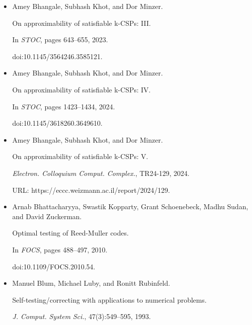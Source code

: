 \begin{itemize}
doi:10.1145/3564246.3585120.





\item[] 
[11]

Amey Bhangale, Subhash Khot, and Dor Minzer.


On approximability of satisfiable k-CSPs: III.


In \emph{STOC}, pages 643–655, 2023.


doi:10.1145/3564246.3585121.





\item[] 
[12]

Amey Bhangale, Subhash Khot, and Dor Minzer.


On approximability of satisfiable k-CSPs: IV.


In \emph{STOC}, pages 1423–1434, 2024.


doi:10.1145/3618260.3649610.





\item[] 
[13]

Amey Bhangale, Subhash Khot, and Dor Minzer.


On approximability of satisfiable k-CSPs: V.


\emph{Electron. Colloquium Comput. Complex.}, TR24-129, 2024.


URL: https://eccc.weizmann.ac.il/report/2024/129.





\item[] 
[14]

Arnab Bhattacharyya, Swastik Kopparty, Grant Schoenebeck, Madhu Sudan, and
David Zuckerman.


Optimal testing of Reed-Muller codes.


In \emph{FOCS}, pages 488–497, 2010.


doi:10.1109/FOCS.2010.54.





\item[] 
[15]

Manuel Blum, Michael Luby, and Ronitt Rubinfeld.


Self-testing/correcting with applications to numerical problems.


\emph{J. Comput. System Sci.}, 47(3):549–595, 1993.



\end{itemize}
